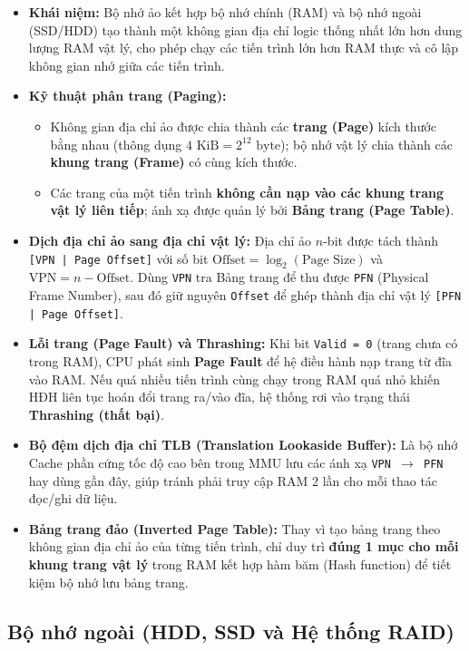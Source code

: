 \begin{itemize}
    \item \textbf{Khái niệm:} Bộ nhớ ảo kết hợp bộ nhớ chính (RAM) và bộ nhớ ngoài (SSD/HDD) tạo thành một không gian địa chỉ logic thống nhất lớn hơn dung lượng RAM vật lý, cho phép chạy các tiến trình lớn hơn RAM thực và cô lập không gian nhớ giữa các tiến trình.
    \item \textbf{Kỹ thuật phân trang (Paging):}
    \begin{itemize}
        \item Không gian địa chỉ ảo được chia thành các \textbf{trang (Page)} kích thước bằng nhau (thông dụng $4\text{ KiB} = 2^{12}\text{ byte}$); bộ nhớ vật lý chia thành các \textbf{khung trang (Frame)} có cùng kích thước.
        \item Các trang của một tiến trình \textbf{không cần nạp vào các khung trang vật lý liên tiếp}; ánh xạ được quản lý bởi \textbf{Bảng trang (Page Table)}.
    \end{itemize}
    \item \textbf{Dịch địa chỉ ảo sang địa chỉ vật lý:} Địa chỉ ảo $n$-bit được tách thành \texttt{[VPN | Page Offset]} với số bit $\text{Offset} = \log_2(\text{Page Size})$ và $\text{VPN} = n - \text{Offset}$. Dùng \texttt{VPN} tra Bảng trang để thu được \texttt{PFN} (Physical Frame Number), sau đó giữ nguyên \texttt{Offset} để ghép thành địa chỉ vật lý \texttt{[PFN | Page Offset]}.
    \item \textbf{Lỗi trang (Page Fault) và Thrashing:} Khi bit \texttt{Valid = 0} (trang chưa có trong RAM), CPU phát sinh \textbf{Page Fault} để hệ điều hành nạp trang từ đĩa vào RAM. Nếu quá nhiều tiến trình cùng chạy trong RAM quá nhỏ khiến HĐH liên tục hoán đổi trang ra/vào đĩa, hệ thống rơi vào trạng thái \textbf{Thrashing (thất bại)}.
    \item \textbf{Bộ đệm dịch địa chỉ TLB (Translation Lookaside Buffer):} Là bộ nhớ Cache phần cứng tốc độ cao bên trong MMU lưu các ánh xạ \texttt{VPN $\rightarrow$ PFN} hay dùng gần đây, giúp tránh phải truy cập RAM 2 lần cho mỗi thao tác đọc/ghi dữ liệu.
    \item \textbf{Bảng trang đảo (Inverted Page Table):} Thay vì tạo bảng trang theo không gian địa chỉ ảo của từng tiến trình, chỉ duy trì \textbf{đúng 1 mục cho mỗi khung trang vật lý} trong RAM kết hợp hàm băm (Hash function) để tiết kiệm bộ nhớ lưu bảng trang.
\end{itemize}

\subsection{Bộ nhớ ngoài (HDD, SSD và Hệ thống RAID)}

